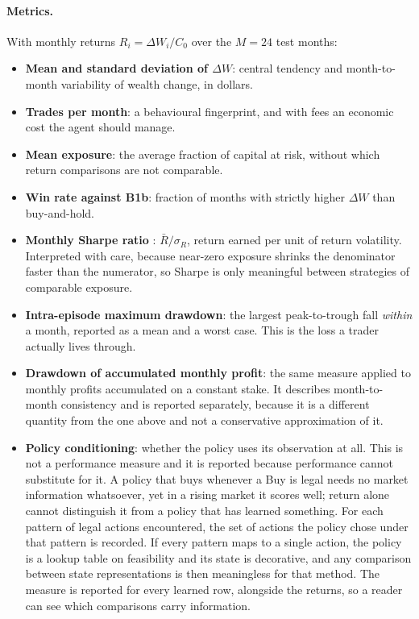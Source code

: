 \paragraph{Metrics.} With monthly returns $R_i = \Delta W_i / C_0$ over
the $M{=}24$ test months:
\begin{itemize}
  \item \textbf{Mean and standard deviation of $\Delta W$}: central
        tendency and month-to-month variability of wealth change, in
        dollars.
  \item \textbf{Trades per month}: a behavioural fingerprint, and with
        fees an economic cost the agent should manage.
  \item \textbf{Mean exposure}: the average fraction of capital at risk,
        without which return comparisons are not comparable.
  \item \textbf{Win rate against B1b}: fraction of months with strictly
        higher $\Delta W$ than buy-and-hold.
  \item \textbf{Monthly Sharpe ratio} \cite{sharpe1994}:
        $\bar{R}/\sigma_R$, return earned per unit of return volatility.
        Interpreted with care, because near-zero exposure shrinks the
        denominator faster than the numerator, so Sharpe is only
        meaningful between strategies of comparable exposure.
  \item \textbf{Intra-episode maximum drawdown}: the largest
        peak-to-trough fall \emph{within} a month, reported as a mean and
        a worst case. This is the loss a trader actually lives through.
  \item \textbf{Drawdown of accumulated monthly profit}: the same measure
        applied to monthly profits accumulated on a constant stake. It
        describes month-to-month consistency and is reported separately,
        because it is a different quantity from the one above and not a
        conservative approximation of it.
  \item \textbf{Policy conditioning}: whether the policy uses its
        observation at all. This is not a performance measure and it is
        reported because performance cannot substitute for it. A policy that
        buys whenever a Buy is legal needs no market information
        whatsoever, yet in a rising market it scores well; return alone
        cannot distinguish it from a policy that has learned something. For
        each pattern of legal actions encountered, the set of actions the
        policy chose under that pattern is recorded. If every pattern maps
        to a single action, the policy is a lookup table on feasibility and
        its state is decorative, and any comparison between state
        representations is then meaningless for that method. The measure is
        reported for every learned row, alongside the returns, so a reader
        can see which comparisons carry information.
\end{itemize}

